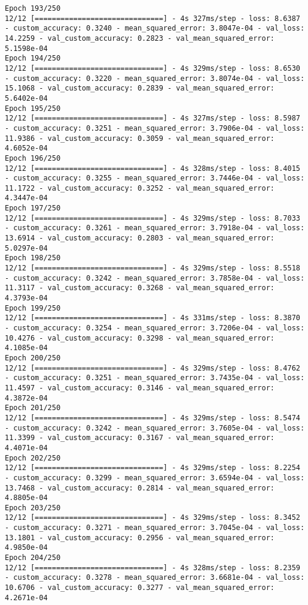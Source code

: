 \begin{lstlisting}
Epoch 193/250
12/12 [==============================] - 4s 327ms/step - loss: 8.6387 - custom_accuracy: 0.3240 - mean_squared_error: 3.8047e-04 - val_loss: 14.2259 - val_custom_accuracy: 0.2823 - val_mean_squared_error: 5.1598e-04
Epoch 194/250
12/12 [==============================] - 4s 329ms/step - loss: 8.6530 - custom_accuracy: 0.3220 - mean_squared_error: 3.8074e-04 - val_loss: 15.1068 - val_custom_accuracy: 0.2839 - val_mean_squared_error: 5.6402e-04
Epoch 195/250
12/12 [==============================] - 4s 327ms/step - loss: 8.5987 - custom_accuracy: 0.3251 - mean_squared_error: 3.7906e-04 - val_loss: 11.9386 - val_custom_accuracy: 0.3059 - val_mean_squared_error: 4.6052e-04
Epoch 196/250
12/12 [==============================] - 4s 328ms/step - loss: 8.4015 - custom_accuracy: 0.3255 - mean_squared_error: 3.7446e-04 - val_loss: 11.1722 - val_custom_accuracy: 0.3252 - val_mean_squared_error: 4.3447e-04
Epoch 197/250
12/12 [==============================] - 4s 329ms/step - loss: 8.7033 - custom_accuracy: 0.3261 - mean_squared_error: 3.7918e-04 - val_loss: 13.6914 - val_custom_accuracy: 0.2803 - val_mean_squared_error: 5.0297e-04
Epoch 198/250
12/12 [==============================] - 4s 329ms/step - loss: 8.5518 - custom_accuracy: 0.3242 - mean_squared_error: 3.7858e-04 - val_loss: 11.3117 - val_custom_accuracy: 0.3268 - val_mean_squared_error: 4.3793e-04
Epoch 199/250
12/12 [==============================] - 4s 331ms/step - loss: 8.3870 - custom_accuracy: 0.3254 - mean_squared_error: 3.7206e-04 - val_loss: 10.4276 - val_custom_accuracy: 0.3298 - val_mean_squared_error: 4.1085e-04
Epoch 200/250
12/12 [==============================] - 4s 329ms/step - loss: 8.4762 - custom_accuracy: 0.3251 - mean_squared_error: 3.7435e-04 - val_loss: 11.4597 - val_custom_accuracy: 0.3146 - val_mean_squared_error: 4.3872e-04
Epoch 201/250
12/12 [==============================] - 4s 329ms/step - loss: 8.5474 - custom_accuracy: 0.3242 - mean_squared_error: 3.7605e-04 - val_loss: 11.3399 - val_custom_accuracy: 0.3167 - val_mean_squared_error: 4.4071e-04
Epoch 202/250
12/12 [==============================] - 4s 329ms/step - loss: 8.2254 - custom_accuracy: 0.3299 - mean_squared_error: 3.6594e-04 - val_loss: 13.7468 - val_custom_accuracy: 0.2814 - val_mean_squared_error: 4.8805e-04
Epoch 203/250
12/12 [==============================] - 4s 329ms/step - loss: 8.3452 - custom_accuracy: 0.3271 - mean_squared_error: 3.7045e-04 - val_loss: 13.1801 - val_custom_accuracy: 0.2956 - val_mean_squared_error: 4.9850e-04
Epoch 204/250
12/12 [==============================] - 4s 328ms/step - loss: 8.2359 - custom_accuracy: 0.3278 - mean_squared_error: 3.6681e-04 - val_loss: 10.6706 - val_custom_accuracy: 0.3277 - val_mean_squared_error: 4.2671e-04

\end{lstlisting}
